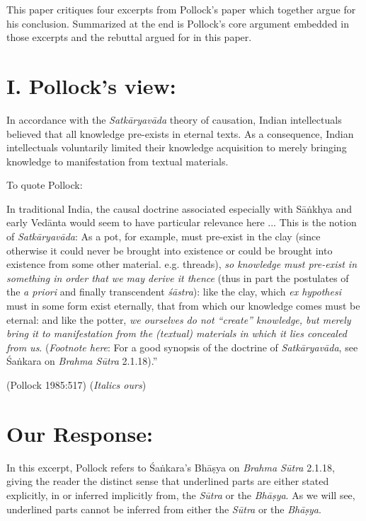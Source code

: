 This paper critiques four excerpts from Pollock's paper which together argue for his conclusion. Summarized at the end is Pollock's core argument embedded in those excerpts and the rebuttal argued for in this paper.

\section*{I. Pollock's view:}  

In accordance with the {\sl Satkāryavāda} theory of causation, Indian intellectuals believed that all knowledge pre-exists in eternal texts. As a consequence, Indian intellectuals voluntarily limited their knowledge acquisition to merely bringing knowledge to manifestation from textual materials.

To quote Pollock:
\begin{myquote}
In traditional India, the causal doctrine associated especially with Sāṅkhya and early Vedānta would seem to have particular relevance here ... This is the notion of {\sl Satkāryavāda}: As a pot, for example, must pre-exist in the clay (since otherwise it could never be brought into existence or could be brought into existence from some other material. e.g.  threads), {\sl so knowledge must pre-exist in something in order that we may derive it thence} (thus in part the postulates of the {\sl a priori} and finally transcendent {\sl śāstra}): like the clay, which {\sl ex hypothesi} must in some form exist eternally, that from which our knowledge comes must be eternal: and like the potter, {\sl we ourselves do not ``create'' knowledge, but merely bring it to manifestation from the (textual) materials in which it lies concealed from us}. ({\sl Footnote here}: For a good synopsis of the doctrine of {\sl Satkāryavāda}, see Śaṅkara on {\sl Brahma Sūtra} 2.1.18).''  

\hfill (Pollock 1985:517) ({\sl Italics ours})
\end{myquote}

\section*{Our Response:}

In this excerpt, Pollock refers to Śaṅkara's Bhāṣya on {\sl Brahma Sūtra} 2.1.18, giving the reader the distinct sense that underlined parts are either stated explicitly, in or inferred implicitly from, the {\sl Sūtra} or the {\sl Bhāṣya}.  As we will see, underlined parts cannot be inferred from either the {\sl Sūtra} or the {\sl Bhāṣya}.

